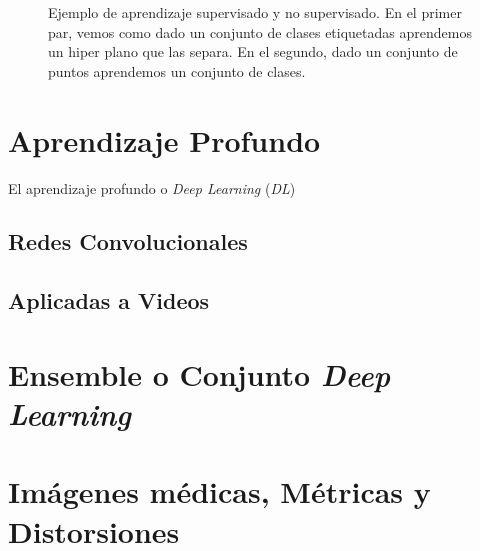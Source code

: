\begin{figure}[htp]
  \caption{Ejemplo de aprendizaje supervisado y no supervisado. En el primer par, 
  vemos como dado un conjunto de clases etiquetadas aprendemos un hiper plano que 
  las separa. En el segundo, dado un conjunto de puntos aprendemos un conjunto de clases.
}
  \label{fig:MLExamples}
\end{figure}


\section{Aprendizaje Profundo}
El aprendizaje profundo o \emph{Deep Learning} (\emph{DL}) 
\subsection{Redes Convolucionales} 
\subsection{Aplicadas a Videos} 
\section{Ensemble o Conjunto \emph{Deep Learning}}
\section{Imágenes médicas, Métricas y Distorsiones}
\label{sec:Distorsiones}
